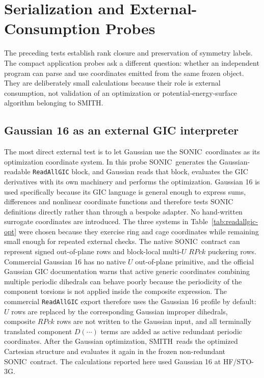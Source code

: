 \documentclass[journal=jctcce,manuscript=article,layout=traditional]{achemso}
\newcommand{\SONIC}{SONIC}
\newcommand{\SMITH}{\textsc{SMITH}}
\theoremstyle{definition}
\begin{document}
\section{Serialization and External-Consumption Probes}

The preceding tests establish rank closure and preservation of symmetry labels.
The compact application probes ask a different
question: whether an independent program can parse and use coordinates emitted
from the same frozen object.  They are deliberately small calculations because
their role is external consumption, not validation of an optimization or
potential-energy-surface algorithm belonging to SMITH.

\subsection{Gaussian 16 as an external GIC interpreter}

The most direct external test is to let Gaussian use the \SONIC\ coordinates as its
optimization coordinate system.  In this probe \SONIC\ generates the
Gaussian-readable \texttt{ReadAllGIC} block, and Gaussian reads that block,
evaluates the GIC derivatives with its own machinery and performs the
optimization.  Gaussian 16 is used specifically because its GIC language is
general enough to express sums, differences and nonlinear coordinate functions
and therefore tests SONIC definitions directly rather than through a bespoke
adapter.  No hand-written surrogate coordinates are introduced.  The three
systems in Table~\ref{tab:readallgic-opt} were chosen because they exercise
ring and cage coordinates while remaining small enough for repeated external
checks.  The native \SONIC\ contract can represent signed out-of-plane rows and
block-local multi-\(U\) \(RPck\) puckering rows.  Commercial Gaussian 16 has no native \(U\) out-of-plane
primitive, and the official Gaussian GIC documentation warns that active
generic coordinates combining multiple periodic dihedrals can behave poorly
because the periodicity of the component torsions is not applied inside the
composite expression.\cite{GaussianGICManual}  The commercial
\texttt{ReadAllGIC} export therefore uses the Gaussian 16 profile by default:
\(U\) rows are replaced by the corresponding
Gaussian improper dihedrals, composite \(RPck\) rows are not written to the
Gaussian input, and all terminally translated component \(D(\cdots)\) terms are added as active
redundant periodic coordinates.  After the Gaussian optimization, \SMITH\ reads
the optimized Cartesian structure and evaluates it again in the frozen
non-redundant \SONIC\ contract.  The calculations reported here used Gaussian
16 at HF/STO-3G.
\end{document}
